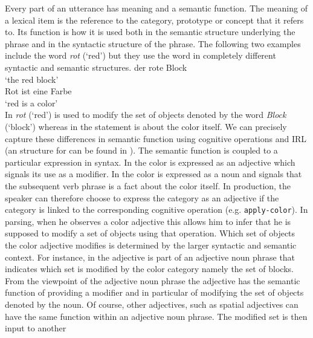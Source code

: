 Every part of an utterance has meaning and a semantic function. The 
meaning of a lexical item is the reference to the category, prototype 
or concept that it refers to. Its function is how it is used both 
in the semantic structure underlying the phrase  and in the
syntactic structure of the phrase. The following two examples
include the word \textit{rot} (`red') but they use the word in completely 
different syntactic and semantic structures.
\ea\label{ex:4:1}
der rote Block\\
\glt `the red block'\\
\z
\ea\label{ex:4:2}
Rot ist eine Farbe\\
\glt `red is a color'\\
\z
In  \textit{rot} (`red') is used to modify the set of objects
denoted by the word \textit{Block} (`block') whereas in  the
statement is about the color itself. We can precisely capture 
these differences in semantic function using cognitive operations
and IRL (an structure for  can be found in ). 
The semantic function is coupled to a particular expression
in syntax. In  the color is expressed
as an adjective which signals its use as a modifier.  
In  the color is expressed as a noun and
signals that the subsequent verb phrase is a fact about the color itself. 
In production, the speaker can therefore choose to express
the category as an adjective if the category is linked to the corresponding
cognitive operation (e.g. {\footnotesize\tt apply-color}). In parsing, when
he observes a color adjective this allows him to infer
that he is supposed to modify a set of objects using that operation.
Which set of objects the color adjective modifies is determined
by the larger syntactic and semantic context. For instance, in 
 the adjective is part of an adjective noun phrase that 
indicates which set is modified by the color category namely
the set of blocks. From the viewpoint of the adjective noun phrase
the adjective has the semantic function of providing a modifier and in 
particular of modifying the set of objects denoted by the noun. Of course, other adjectives,
such as spatial adjectives can have the same function within an 
adjective noun phrase. The modified set is then input to another
